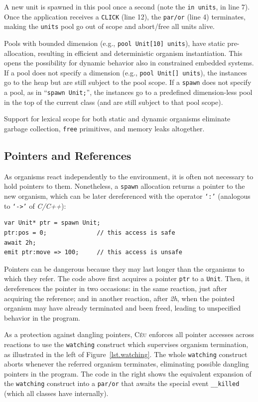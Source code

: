 \documentclass{acm_proc_article-sp}
\newcommand{\CEU}{\textsc{C\'{e}u}\xspace}
\newcommand{\code}[1] {{\small{\texttt{#1}}}}
\newcommand{\1}{\;}
\newcommand{\2}{\;\;}
\newcommand{\3}{\;\;\;}
\newcommand{\5}{\;\;\;\;\;}
\begin{document}
A new unit is spawned in this pool once a second (note the \code{in units}, in 
line 7).
Once the application receives a \code{CLICK} (line 12), the \code{par/or} (line 
4) terminates, making the \code{units} pool go out of scope and abort/free all 
units alive.

Pools with bounded dimension (e.g., \code{pool Unit[10] units}), have static 
pre-allocation, resulting in efficient and deterministic organism 
instantiation.
This opens the possibility for dynamic behavior also in constrained embedded 
systems.
%
If a pool does not specify a dimension (e.g., \code{pool Unit[] units}), the 
instances go to the heap but are still subject to the pool scope.
%
If a \code{spawn} does not specify a pool, as in ``\code{spawn Unit;}'', the 
instances go to a predefined dimension-less pool in the top of the current 
class (and are still subject to that pool scope).

Support for lexical scope for both static and dynamic organisms eliminate 
garbage collection, \code{free} primitives, and memory leaks altogether.

\subsection{Pointers and References}
\label{sec.orgs.refs}

As organisms react independently to the environment, it is often not necessary 
to hold pointers to them.
%
Nonetheless, a \code{spawn} allocation returns a pointer to the new organism, 
which can be later dereferenced with the operator \code{`:'} (analogous to 
\code{`->'} of \emph{C/C++}):

\begin{lstlisting}
var Unit* ptr = spawn Unit;
ptr:pos = 0;              // this access is safe
await 2h;
emit ptr:move => 100;     // this access is unsafe
\end{lstlisting}

Pointers can be dangerous because they may last longer than the organisms to 
which they refer.
%
The code above first acquires a pointer \code{ptr} to a \code{Unit}.
Then, it dereferences the pointer in two occasions:
in the same reaction, just after acquiring the reference;
and in another reaction, after \emph{2h}, when the pointed organism may have 
already terminated and been freed, leading to unspecified behavior in the 
program.

As a protection against dangling pointers, \CEU enforces all pointer accesses 
across reactions to use the \code{watching} construct which supervises organism 
termination, as illustrated in the left of Figure~\ref{lst.watching}.
%
The whole \code{watching} construct aborts whenever the referred organism 
terminates, eliminating possible dangling pointers in the program.
%
The code in the right shows the equivalent expansion of the \code{watching} 
construct into a \code{par/or} that awaits the special event \code{\_\_killed} 
(which all classes have internally).
\end{document}
